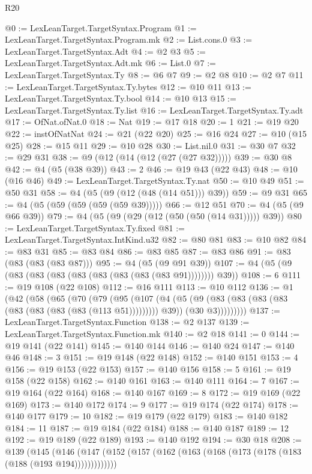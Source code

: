 \begin{lexlean}{R20}
\begin{coremodule}
@0 := LexLeanTarget.TargetSyntax.Program
@1 := LexLeanTarget.TargetSyntax.Program.mk
@2 := List.cons.{0}
@3 := LexLeanTarget.TargetSyntax.Adt
@4 := @2 @3
@5 := LexLeanTarget.TargetSyntax.Adt.mk
@6 := List.{0}
@7 := LexLeanTarget.TargetSyntax.Ty
@8 := @6 @7
@9 := @2 @8
@10 := @2 @7
@11 := LexLeanTarget.TargetSyntax.Ty.bytes
@12 := @10 @11
@13 := LexLeanTarget.TargetSyntax.Ty.bool
@14 := @10 @13
@15 := LexLeanTarget.TargetSyntax.Ty.list
@16 := LexLeanTarget.TargetSyntax.Ty.adt
@17 := OfNat.ofNat.{0}
@18 := Nat
@19 := @17 @18
@20 := 1
@21 := @19 @20
@22 := instOfNatNat
@24 := @21 (@22 @20)
@25 := @16 @24
@27 := @10 (@15 @25)
@28 := @15 @11
@29 := @10 @28
@30 := List.nil.{0}
@31 := @30 @7
@32 := @29 @31
@38 := @9 (@12 (@14 (@12 (@27 (@27 @32)))))
@39 := @30 @8
@42 := @4 (@5 (@38 @39))
@43 := 2
@46 := @19 @43 (@22 @43)
@48 := @10 (@16 @46)
@49 := LexLeanTarget.TargetSyntax.Ty.nat
@50 := @10 @49
@51 := @50 @31
@58 := @4 (@5 (@9 (@12 (@48 (@14 @51))) @39))
@59 := @9 @31
@65 := @4 (@5 (@59 (@59 (@59 (@59 @39)))))
@66 := @12 @51
@70 := @4 (@5 (@9 @66 @39))
@79 := @4 (@5 (@9 (@29 (@12 (@50 (@50 (@14 @31))))) @39))
@80 := LexLeanTarget.TargetSyntax.Ty.fixed
@81 := LexLeanTarget.TargetSyntax.IntKind.u32
@82 := @80 @81
@83 := @10 @82
@84 := @83 @31
@85 := @83 @84
@86 := @83 @85
@87 := @83 @86
@91 := @83 (@83 (@83 (@83 @87)))
@95 := @4 (@5 (@9 @91 @39))
@107 := @4 (@5 (@9 (@83 (@83 (@83 (@83 (@83 (@83 (@83 (@83 @91)))))))) @39))
@108 := 6
@111 := @19 @108 (@22 @108)
@112 := @16 @111
@113 := @10 @112
@136 := @1
    (@42
      (@58
        (@65
          (@70
            (@79
              (@95
                (@107
                  (@4
                    (@5 (@9 (@83 (@83 (@83 (@83 (@83 (@83 (@83 (@83 (@113 @51))))))))) @39))
                    (@30 @3)))))))))
@137 := LexLeanTarget.TargetSyntax.Function
@138 := @2 @137
@139 := LexLeanTarget.TargetSyntax.Function.mk
@140 := @2 @18
@141 := 0
@144 := @19 @141 (@22 @141)
@145 := @140 @144
@146 := @140 @24
@147 := @140 @46
@148 := 3
@151 := @19 @148 (@22 @148)
@152 := @140 @151
@153 := 4
@156 := @19 @153 (@22 @153)
@157 := @140 @156
@158 := 5
@161 := @19 @158 (@22 @158)
@162 := @140 @161
@163 := @140 @111
@164 := 7
@167 := @19 @164 (@22 @164)
@168 := @140 @167
@169 := 8
@172 := @19 @169 (@22 @169)
@173 := @140 @172
@174 := 9
@177 := @19 @174 (@22 @174)
@178 := @140 @177
@179 := 10
@182 := @19 @179 (@22 @179)
@183 := @140 @182
@184 := 11
@187 := @19 @184 (@22 @184)
@188 := @140 @187
@189 := 12
@192 := @19 @189 (@22 @189)
@193 := @140 @192
@194 := @30 @18
@208 := @139
    (@145 (@146 (@147 (@152 (@157 (@162 (@163 (@168 (@173 (@178 (@183 (@188 (@193 @194)))))))))))))

\end{coremodule}
\end{lexlean}
